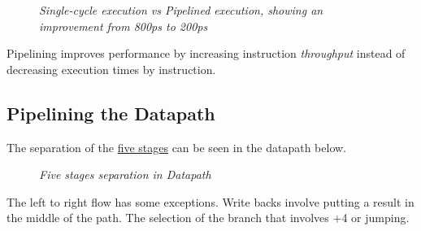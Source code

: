 \documentclass[11pt]{article}
\begin{document}
\begin{figure}[htbp]
    \centering
    \caption{\textit{Single-cycle execution vs Pipelined execution, showing an improvement from 800ps to 200ps}}
\end{figure}

Pipelining improves performance by increasing instruction \textit{throughput} instead of decreasing execution times by instruction.

\subsection*{Pipelining the Datapath}

The separation of the \hyperref[jmp:five-stages]{five stages} can be seen in the datapath below.

\begin{figure}[htbp]
    \centering
    \caption{\textit{Five stages separation in Datapath}}
\end{figure}

The left to right flow has some exceptions. Write backs involve putting a result in the middle of the path. The selection of the branch that involves +4 or jumping.
\end{document}
